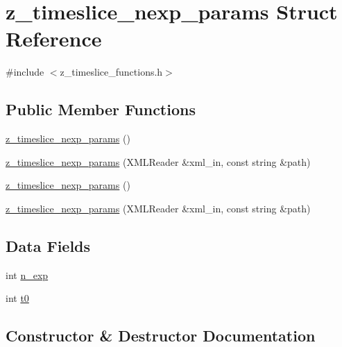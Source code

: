 \hypertarget{structz__timeslice__nexp__params}{}\section{z\+\_\+timeslice\+\_\+nexp\+\_\+params Struct Reference}
\label{structz__timeslice__nexp__params}


{\ttfamily \#include $<$z\+\_\+timeslice\+\_\+functions.\+h$>$}

\subsection*{Public Member Functions}
\begin{DoxyCompactItemize}
\item 
\mbox{\hyperlink{structz__timeslice__nexp__params_acd501dd79da744ce75663ef7788dd3e8}{z\+\_\+timeslice\+\_\+nexp\+\_\+params}} ()
\item 
\mbox{\hyperlink{structz__timeslice__nexp__params_ac623b4d5088b21d5a8e5b2054a8c1fcf}{z\+\_\+timeslice\+\_\+nexp\+\_\+params}} (X\+M\+L\+Reader \&xml\+\_\+in, const string \&path)
\item 
\mbox{\hyperlink{structz__timeslice__nexp__params_acd501dd79da744ce75663ef7788dd3e8}{z\+\_\+timeslice\+\_\+nexp\+\_\+params}} ()
\item 
\mbox{\hyperlink{structz__timeslice__nexp__params_ac623b4d5088b21d5a8e5b2054a8c1fcf}{z\+\_\+timeslice\+\_\+nexp\+\_\+params}} (X\+M\+L\+Reader \&xml\+\_\+in, const string \&path)
\end{DoxyCompactItemize}
\subsection*{Data Fields}
\begin{DoxyCompactItemize}
\item 
int \mbox{\hyperlink{structz__timeslice__nexp__params_a767b08b06630e4d6f76a314bdd77338e}{n\+\_\+exp}}
\item 
int \mbox{\hyperlink{structz__timeslice__nexp__params_ae1599f0639036212a58dd1a09fbc5edf}{t0}}
\end{DoxyCompactItemize}


\subsection{Constructor \& Destructor Documentation}
\mbox{\label{structz__timeslice__nexp__params_acd501dd79da744ce75663ef7788dd3e8}} 
